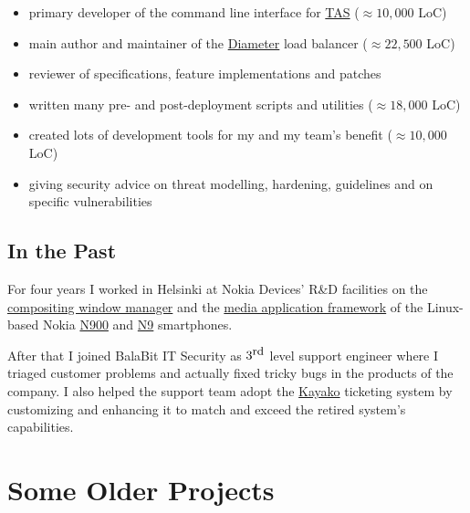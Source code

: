 \documentclass[a4paper,12pt]{article}
\newcommand{\compress}{\setlength\itemsep{-\parskip}}
\newenvironment{compressedItemize}{\begin{itemize}\compress}{\end{itemize}}
\begin{document}
\begin{compressedItemize}
\item	primary developer of the command line interface for
	\hyperlink{TAS}{TAS} ($\approx 10{,}000$ LoC)
\item	main author and maintainer of the
	\href{http://tools.ietf.org/html/rfc6733}{Diameter} load balancer
	($\approx 22{,}500$ LoC)
\item	reviewer of specifications, feature implementations and patches
\item	written many pre- and post-deployment scripts and utilities
	($\approx 18{,}000$ LoC)
\item	created lots of development tools for my and my team's benefit
	($\approx 10{,}000$ LoC)
\item	giving security advice on threat modelling, hardening, guidelines
	and on specific vulnerabilities
\end{compressedItemize}

\subsection*{In the Past}

For four years I worked in Helsinki at \hypertarget{gadgets}{Nokia Devices'
R\&D facilities} on the
\href{http://wiki.maemo.org/Documentation/Maemo_5_Developer_Guide/Architecture/UI_Framework#hildon-desktop}{compositing window manager} and the
\href{http://wiki.maemo.org/Documentation/Maemo_5_Developer_Guide/Using_Multimedia_Components/Media_Application_Framework_(MAFW)}{media application framework}
of the Linux-based Nokia \href{http://maemo.org/intro/maemo_history}{N900}
and \href{http://en.wikipedia.org/wiki/Nokia_N9}{N9} smartphones.

\medskip
After that I joined BalaBit IT Security as $3^{\textrm{\small rd}}$ level
support engineer where I triaged customer problems and actually fixed
tricky bugs in the products of the company.  I also helped the support
team adopt the \href{http://www.kayako.com}{Kayako} ticketing system by
customizing and enhancing it to match and exceed the retired system's
capabilities.

\section{Some Older Projects}
\end{document}
